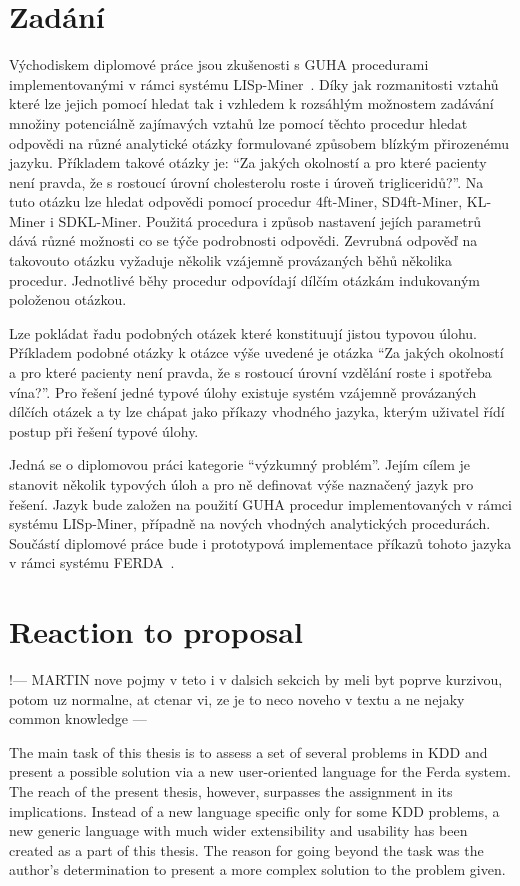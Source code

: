 \documentclass[a4paper,12pt]{book}
\newcommand{\uv}[1]{``#1''}
\begin{document}
\section{Zadání}
Východiskem diplomové práce jsou zkušenosti s GUHA procedurami implementovanými v rámci systému LISp-Miner~\cite{GMGC}. Díky jak rozmanitosti vztahů které lze jejich pomocí hledat tak i vzhledem k rozsáhlým možnostem zadávání množiny potenciálně zajímavých vztahů lze pomocí těchto procedur hledat odpovědi na různé analytické otázky formulované způsobem blízkým přirozenému jazyku. Příkladem takové otázky je: \uv{Za jakých okolností a pro které pacienty není pravda, že s rostoucí úrovní cholesterolu roste i úroveň trigliceridů?}. Na tuto otázku lze hledat odpovědi pomocí procedur 4ft-Miner, SD4ft-Miner, KL-Miner i SDKL-Miner. Použitá procedura i způsob nastavení jejích parametrů dává různé možnosti co se týče podrobnosti odpovědi. Zevrubná odpověď na takovouto otázku vyžaduje několik vzájemně provázaných běhů několika procedur. Jednotlivé běhy procedur odpovídají dílčím otázkám indukovaným položenou otázkou.

Lze pokládat řadu podobných otázek které konstituují jistou typovou úlohu. Příkladem podobné otázky k otázce výše uvedené je otázka \uv{Za jakých okolností a pro které pacienty není pravda, že s rostoucí úrovní vzdělání roste i spotřeba vína?}. Pro řešení jedné typové úlohy existuje systém vzájemně provázaných dílčích otázek a ty lze chápat jako příkazy vhodného jazyka, kterým uživatel řídí postup při řešení typové úlohy.

Jedná se o diplomovou práci kategorie \uv{výzkumný problém}. Jejím cílem je stanovit několik typových úloh a pro ně definovat výše naznačený jazyk pro řešení. Jazyk bude založen na použití GUHA procedur implementovaných v rámci systému LISp-Miner, případně na nových vhodných analytických procedurách. Součástí diplomové práce bude i prototypová implementace příkazů tohoto jazyka v rámci systému FERDA~\cite{znalosti2006}.

\section{Reaction to proposal}
!--- MARTIN nove pojmy v teto i v dalsich sekcich by meli byt poprve kurzivou, potom uz normalne, at ctenar vi, ze je to neco noveho v textu a ne nejaky common knowledge ---

The main task of this thesis is to assess a set of several problems in KDD and present a possible solution via a new user-oriented language for the Ferda system. The reach of the present thesis, however, surpasses the assignment in its implications. Instead of a new language specific only for some KDD problems, a new generic language with much wider extensibility and usability has been created as a part of this thesis. The reason for going beyond the task was the author's determination to present a more complex solution to the problem given. 
\end{document}
